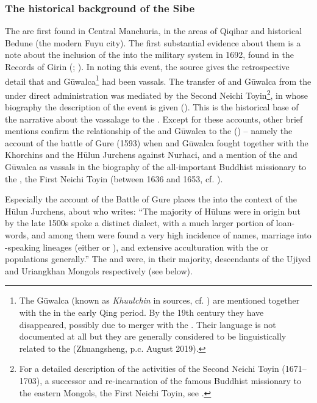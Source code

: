 \documentclass[output=paper,colorlinks,citecolor=brown]{langscibook}
\begin{document}
\subsubsection{The historical background of the Sibe}

The  are first found in Central Manchuria, in the areas of Qiqihar and historical Bedune (the modern Fuyu city). The first substantial evidence about them is a note about the inclusion of the  into the  military system in 1692, found in the Records of Girin (\citealt[51]{Zhuangsheng2019}; \citealt[8]{Sárközi2019}). In noting this event, the source gives the retrospective detail that  and Gūwalca\footnote{The Gūwalca (known as \textit{Khuulchin} in  sources, cf. \citealt[232--233]{Ujeed2013}) are mentioned together with the  in the early Qing period. By the 19th century they have disappeared, possibly due to merger with the . Their language is not documented at all but they are generally considered to be linguistically related to the  (Zhuangsheng, p.c. August 2019).} had been  vassals. The transfer of  and Gūwalca from the  under direct  administration was mediated by the Second Neichi Toyin\footnote{For a detailed description of the activities of the Second Neichi Toyin (1671--1703), a successor and re-incarnation of the famous Buddhist missionary to the eastern Mongols, the First Neichi Toyin, see \citet{Ujeed2013}.}, in whose biography the description of the event is given (\citealt[232--233]{Ujeed2013}). This is the historical base of the narrative about the  vassalage to the . Except for these accounts, other brief mentions confirm the relationship of the  and Gūwalca to the   (\citealt[35]{Gorelova2002}) – namely the account of the battle of Gure (1593) when  and Gūwalca fought together with the Khorchins and the Hūlun Jurchens against Nurhaci, and a mention of the  and Gūwalca as  vassals in the biography of the all-important Buddhist missionary to the , the First Neichi Toyin (between 1636 and 1653, cf. \citealt[36]{Heissig1980}).\largerpage

Especially the account of the Battle of Gure places the  into the context of the Hūlun Jurchens, about who \citet[65]{Crossley2006} writes: “The majority of Hūluns were  in origin but by the late 1500s spoke a distinct dialect, with a much larger portion of  loan-words, and among them were found a very high incidence of  names, marriage into -speaking lineages (either  or ), and extensive acculturation with the  or  populations generally.” The  and  were, in their majority, descendants of the Ujiyed and Uriangkhan Mongols respectively (see below).
\end{document}
